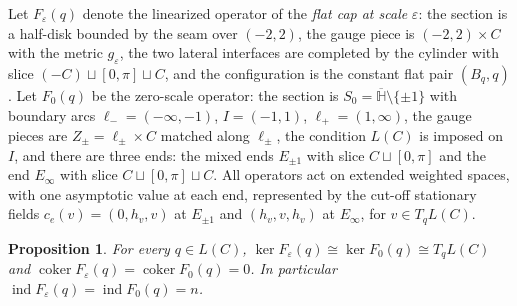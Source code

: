 \documentclass[11pt]{amsart}
\newtheorem{proposition}[theorem]{Proposition}
\theoremstyle{definition}
\theoremstyle{remark}
\theoremstyle{plain}
\numberwithin{equation}{section}
\newcommand{\Hb}{\mathbb{H}}
\newcommand{\ind}{\operatorname{ind}}
\newcommand{\coker}{\operatorname{coker}}
\newcommand{\eps}{\varepsilon}
\begin{document}
Let $F_\eps(q)$ denote the linearized operator of the \emph{flat cap at
scale} $\eps$: the section is a half-disk bounded by the seam over
$(-2,2)$, the gauge piece is $(-2,2)\times C$ with the metric $g_\eps$,
the two lateral interfaces are completed by the cylinder with slice
$(-C)\sqcup[0,\pi]\sqcup C$, and the configuration is the constant flat pair
$(B_q,q)$. Let $F_0(q)$ be the zero-scale operator: the section is
$S_0=\overline{\Hb}\setminus\{\pm1\}$ with boundary arcs
$\ell_-=(-\infty,-1)$, $I=(-1,1)$, $\ell_+=(1,\infty)$, the gauge pieces are
$Z_\pm=\ell_\pm\times C$ matched along $\ell_\pm$, the condition $L(C)$ is
imposed on $I$, and there are three ends: the mixed ends $E_{\pm1}$ with
slice $C\sqcup[0,\pi]$ and the end $E_\infty$ with slice
$C\sqcup[0,\pi]\sqcup C$. All operators act on extended weighted spaces, with one asymptotic value at
each end, represented by the cut-off stationary fields $c_e(v)=(0,h_v,v)$ at $E_{\pm1}$ and $(h_v,v,h_v)$ at $E_\infty$,
for $v\in T_qL(C)$.

\begin{proposition}\label{prop:caps}
For every $q\in L(C)$, $\ker F_\eps(q)\cong\ker F_0(q)\cong T_qL(C)$ and
$\coker F_\eps(q)=\coker F_0(q)=0$. In particular
$\ind F_\eps(q)=\ind F_0(q)=n$.
\end{proposition}
\end{document}
